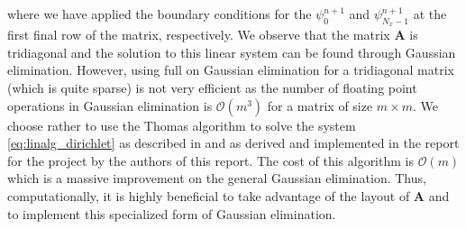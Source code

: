 \documentclass[12pt]{article}
\numberwithin{figure}{section}
\numberwithin{table}{section}
\begin{document}
where we have applied the boundary conditions for the $\psi_0^{n+1}$ and $\psi_{N_x-1}^{n+1}$ at the first final row of the matrix, respectively. We observe that the matrix $\mathbf{A}$ is tridiagonal and the solution to this linear system can be found through Gaussian elimination. However, using full on Gaussian elimination for a tridiagonal matrix (which is quite sparse) is not very efficient as the number of floating point operations in Gaussian elimination is $\mathcal{O}(m^3)$ for a matrix of size $m\times m$. We choose rather to use the Thomas algorithm to solve the system \eqref{eq:linalg_dirichlet} as described in \cite{Comp} and as derived and implemented in the report for the project \cite{Report1} by the authors of this report. The cost of this algorithm is $\mathcal{O}(m)$ which is a massive improvement on the general Gaussian elimination. Thus, computationally, it is highly beneficial to take advantage of the layout of $\mathbf{A}$ and to implement this specialized form of Gaussian elimination. \\
\end{document}
